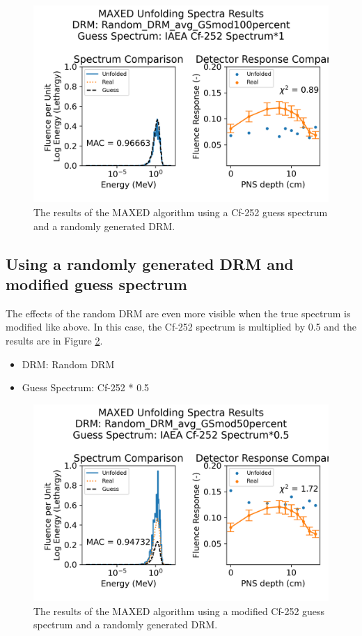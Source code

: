 \begin{figure}[htb]
  \centering
  \includegraphics[scale=0.8]{images/Random_DRM_avg_GSmod100percent_IAEA Cf-252 Spectrum_0.png}
  \caption{The results of the MAXED algorithm using a Cf-252 guess spectrum and a randomly generated DRM.} \label{MAXED_result_randomDRM_gs100Cf}
\end{figure}

\subsection*{Using a randomly generated DRM and modified guess spectrum}
The effects of the random DRM are even more visible when the true spectrum is modified like above. In this case, the Cf-252 spectrum is multiplied by 0.5 and the results are in Figure \ref{MAXED_result_randomDRM_gs50Cf}. 
\begin{itemize}
\item DRM: Random DRM
\item Guess Spectrum: Cf-252 * 0.5
\end{itemize}

\begin{figure}[htb]
  \centering
  \includegraphics[scale=0.8]{images/Random_DRM_avg_GSmod50percent_IAEA Cf-252 Spectrum_0.png}
  \caption{The results of the MAXED algorithm using a modified Cf-252 guess spectrum and a randomly generated DRM.} \label{MAXED_result_randomDRM_gs50Cf}
\end{figure}


